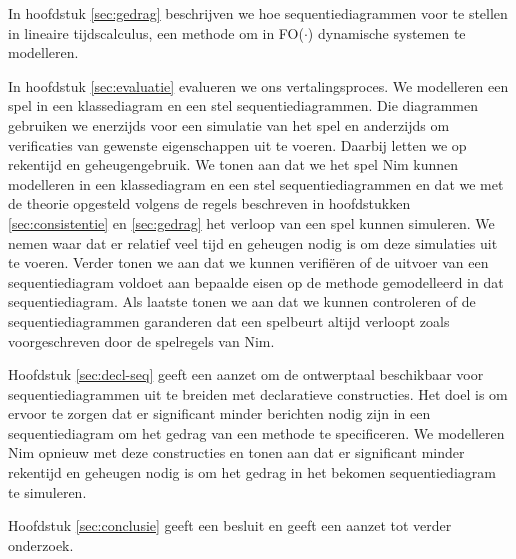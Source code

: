 In hoofdstuk \ref{sec:gedrag} beschrijven we hoe sequentiediagrammen voor te stellen in lineaire tijdscalculus\cite{BogaertsBart2014Sdsu}, een methode om in FO($\cdot$) dynamische systemen te modelleren.

In hoofdstuk \ref{sec:evaluatie} evalueren we ons vertalingsproces. We modelleren een spel in een klassediagram en een stel sequentiediagrammen. Die diagrammen gebruiken we enerzijds voor een simulatie van het spel en anderzijds om verificaties van gewenste eigenschappen uit te voeren. Daarbij letten we op rekentijd en geheugengebruik. We tonen aan dat we het spel Nim kunnen modelleren in een klassediagram en een stel sequentiediagrammen en dat we met de theorie opgesteld volgens de regels beschreven in hoofdstukken \ref{sec:consistentie} en \ref{sec:gedrag} het verloop van een spel kunnen simuleren. We nemen waar dat er relatief veel tijd en geheugen nodig is om deze simulaties uit te voeren. Verder tonen we aan dat we kunnen verifi\"eren of de uitvoer van een sequentiediagram voldoet aan bepaalde eisen op de methode gemodelleerd in dat sequentiediagram. Als laatste tonen we aan dat we kunnen controleren of de sequentiediagrammen garanderen dat een spelbeurt altijd verloopt zoals voorgeschreven door de spelregels van Nim.

Hoofdstuk \ref{sec:decl-seq} geeft een aanzet om de ontwerptaal beschikbaar voor sequentiediagrammen uit te breiden met declaratieve constructies. Het doel is om ervoor te zorgen dat er significant minder berichten nodig zijn in een sequentiediagram om het gedrag van een methode te specificeren. We modelleren Nim opnieuw met deze constructies en tonen aan dat er significant minder rekentijd en geheugen nodig is om het gedrag in het bekomen sequentiediagram te simuleren.

Hoofdstuk \ref{sec:conclusie} geeft een besluit en geeft een aanzet tot verder onderzoek.